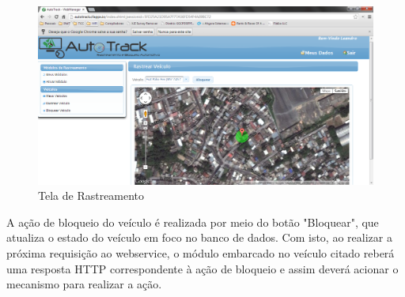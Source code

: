 \begin{figure}[!htb]
	\centering
	\includegraphics[width=\textwidth]{figures/webmanager_rastrear.png}
	\caption{Tela de Rastreamento}
	\label{fig:webmanviewrastrear}
\end{figure}

A ação de bloqueio do veículo é realizada por meio do botão "Bloquear", que atualiza o estado do veículo em foco no banco de dados. Com isto, ao realizar a próxima requisição ao webservice, o módulo embarcado no veículo citado reberá uma resposta HTTP correspondente à ação de bloqueio e assim deverá acionar o mecanismo para realizar a ação.

\hfill

